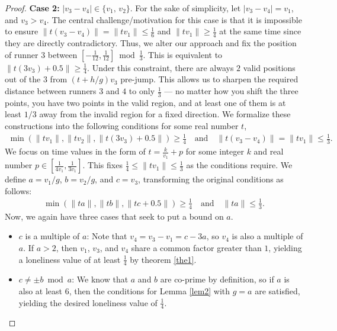 \documentclass[11pt]{amsart}
\newcommand{\norm}[1]{\lVert #1 \rVert}
\begin{document}
\begin{proof}
    \par \textbf{Case 2:} $|v_3 - v_4| \in \{v_1,\, v_2\}$. For the sake of simplicity, let $|v_3 - v_4| = v_1$, and $v_3 > v_4$. The central challenge/motivation for this case is that it is impossible to ensure $\norm{t(v_3 - v_4)} = \norm{tv_1} \leq \frac{1}{6}$ and $\norm{tv_1} \geq \frac{1}{4}$ at the same time since they are directly contradictory. Thus, we alter our approach and fix the position of runner $3$ between $[-\frac{1}{12},\frac{1}{12}] \bmod {\frac{1}{3}}$. This is equivalent to $\norm{t(3v_3) + 0.5} \geq \frac{1}{4}$. Under this constraint, there are always $2$ valid positions out of the $3$ from $(t + h / g)v_3$ pre-jump. This allows us to sharpen the required distance between runners $3$ and $4$ to only $\frac{1}{3}$ — no matter how you shift the three points, you have two points in the valid region, and at least one of them is at least $1/3$ away from the invalid region for a fixed direction. We formalize these constructions into the following conditions for some real number $t$,
    \begin{align*}\min(\norm{tv_1},\norm{tv_2},\norm{t(3v_3) + 0.5}) \geq \frac{1}{4} \quad \text{and} \quad \norm{t(v_3 - v_4)} = \norm{tv_1} \leq \frac{1}{3}.\end{align*}
    We focus on time values in the form of $t = \frac{k}{v_1} + p$ for some integer $k$ and real number $p \in [\frac{1}{4v_1},\frac{1}{3v_1}]$. This fixes $\frac{1}{4} \leq \norm{tv_1} \leq \frac{1}{3}$ as the conditions require. We define $a = v_1 / g$, $b = v_2 / g$, and $c = v_3$, transforming the original conditions as follows:
    \begin{align*}\min(\norm{ta},\norm{tb},\norm{tc + 0.5}) \geq \frac{1}{4} \quad \text{and} \quad \norm{ta} \leq \frac{1}{3}.\end{align*}
    Now, we again have three cases that seek to put a bound on $a$.
    \begin{itemize}
        \item [--] $c$ is a multiple of $a$: Note that $v_4 = v_3 - v_1 = c - 3a$, so $v_4$ is also a multiple of $a$. If $a > 2$, then $v_1$, $v_3$, and $v_4$ share a common factor greater than $1$, yielding a loneliness value of at least $\frac{1}{4}$ by theorem \ref{the1}.
        \item [--] $c \neq \pm b \bmod a$: We know that $a$ and $b$ are co-prime by definition, so if $a$ is also at least $6$, then the conditions for Lemma \ref{lem2} with $g = a$ are satisfied, yielding the desired loneliness value of $\frac{1}{4}$.

\end{itemize}
\end{proof}
\end{document}
